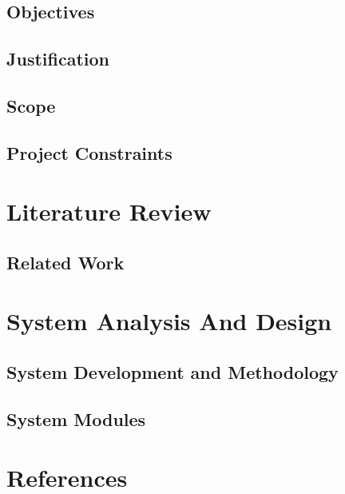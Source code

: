 \documentclass{report}
\begin{document}
\section{Objectives}


\section{Justification}


\section{Scope}


\section{Project Constraints}



\chapter{Literature Review}

\section{Related Work}


\chapter{System Analysis And Design}

\section{System Development and Methodology}


\section{System Modules}





\nocite{businessInsider}
\nocite{carpoolworld}

\chapter{References}


\end{document}
